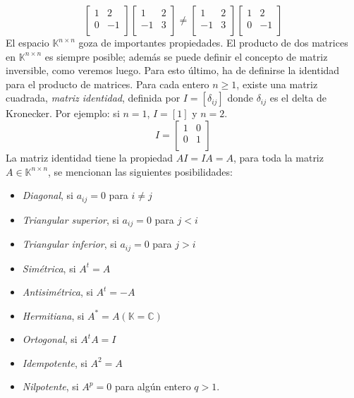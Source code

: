 \documentclass[b5paper, 11pt]{book}
\newcommand{\0}{\mathbf{0}}
\newcommand{\K}{\mathds{K}}
\theoremstyle{estiloB}
\theoremstyle{estiloC}
\theoremstyle{estiloD}
\theoremstyle{estiloE}
\begin{document}
\begin{equation*}
\begin{bmatrix} 
 1 &  2 \\
 0 & -1 \\

\end{bmatrix}
\begin{bmatrix}
 1 & 2 \\
-1 & 3 \\

\end{bmatrix}  
\not=
\begin{bmatrix} 
 1 &  2 \\
-1 &  3 \\

\end{bmatrix}
\begin{bmatrix}
 1 &  2 \\
 0 & -1 \\
\end{bmatrix}
\end{equation*}
El espacio $\K^{n \times n}$ goza de importantes propiedades. El producto de dos matrices en $\K^{n \times n}$ es siempre posible; adem\'{a}s se puede definir el concepto de matriz inversible, como veremos luego. Para esto \'{u}ltimo, ha de definirse la identidad para el producto de matrices. Para cada entero $n \geq 1$, existe una matriz cuadrada, \textit{matriz identidad}, definida por $I=[\delta_{ij}]$ donde $\delta_{ij}$ es el delta de Kronecker. Por ejemplo: si $n=1$, $I=[1]$ y $n=2$.
\begin{equation*}
 I = \begin{bmatrix}
 1 &  0 \\
 0 &  1 \\
\end{bmatrix}
\end{equation*}
La matriz identidad tiene la propiedad $AI = IA = A$, para toda la matriz $A  \in \K^{n \times n}$, se mencionan las siguientes posibilidades:
\begin{itemize}
\item \textit{Diagonal}, si $a_{ij} = 0$ para $i \not= j$
\item \textit{Triangular superior}, si $a_{ij} = 0$ para $ j < i$
\item \textit{Triangular inferior}, si $a_{ij} = 0$ para $ j > i$
\item \textit{Sim\'{e}trica}, si $A^t = A$
\item \textit{Antisim\'{e}trica}, si $A^t = -A$
\item \textit{Hermitiana}, si $A^* = A (\K =\mathds{C})$
\item \textit{Ortogonal}, si $A^tA = I$
\item \textit{Idempotente}, si $A^2 = A$
\item \textit{Nilpotente}, si $A^p = 0$ para alg\'{u}n entero $q > 1$.
\end{itemize}
\end{document}
